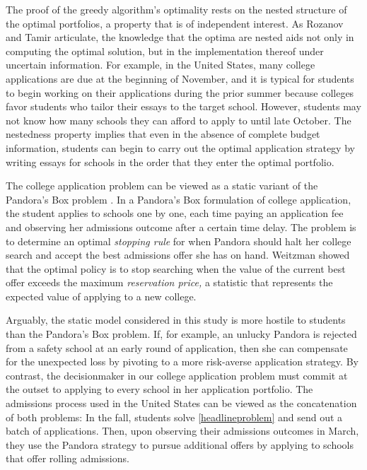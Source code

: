 The proof of the greedy algorithm's optimality rests on the nested structure of the optimal portfolios, a property that is of independent interest. As Rozanov and Tamir \cite{rozanovandtamir2020} articulate, the knowledge that the optima are nested aids not only in computing the optimal solution, but in the implementation thereof under uncertain information. For example, in the United States, many college applications are due at the beginning of November, and it is typical for students to begin working on their applications during the prior summer because colleges favor students who tailor their essays to the target school. However, students may not know how many schools they can afford to apply to until late October. The nestedness property implies that even in the absence of complete budget information, students can begin to carry out the optimal application strategy by writing essays for schools in the order that they enter the optimal portfolio.

The college application problem can be viewed as a static variant of the Pandora's Box problem \cite{weitzman1979,boodaghiansetal2022}. In a Pandora's Box formulation of college application, the student applies to schools one by one, each time paying an application fee and observing her admissions outcome after a certain time delay. The problem is to determine an optimal \emph{stopping rule} for when Pandora should halt her college search and accept the best admissions offer she has on hand. Weitzman showed that the optimal policy is to stop searching when the value of the current best offer exceeds the maximum \emph{reservation price,} a statistic that represents the expected value of applying to a new college.

Arguably, the static model considered in this study is more hostile to students than the Pandora's Box problem. If, for example, an unlucky Pandora is rejected from a safety school at an early round of application, then she can compensate for the unexpected loss by pivoting to a more risk-averse application strategy. By contrast, the decisionmaker in our college application problem must commit at the outset to applying to every school in her application portfolio. The admissions process used in the United States can be viewed as the concatenation of both problems: In the fall, students solve \eqref{headlineproblem} and send out a batch of applications. Then, upon observing their admissions outcomes in March, they use the Pandora strategy to pursue additional offers by applying to schools that offer rolling admissions.

